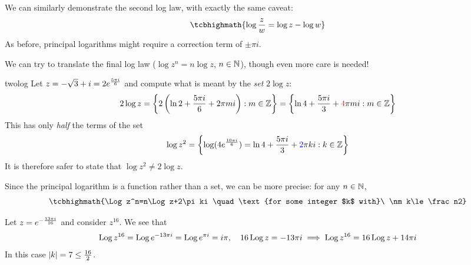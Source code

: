 We can similarly demonstrate the second log law, with exactly the same caveat:
\[
	\tcbhighmath{\log\frac zw=\log z-\log w}
\]
As before, principal logarithms might require a correction term of $\pm\pi i$.\bigbreak

\vfil
\goodbreak%
We can  try to translate the final log law ($\log z^n=n\log z$, $n\in\mathbb{N}$), though even more care is needed!

\begin{example}{}{twolog}
	Let $z=-\sqrt 3+i=2e^{\frac{5\pi i}{6}}$ and compute what is meant by the \emph{set} $2\log z$:
	\[
		2\log z=\left\{2\left(\ln 2+\frac{5\pi i}6 +2\pi mi\right):m\in\mathbb{Z}\right\}
		=\left\{\ln 4+\frac{5\pi i}3+\textcolor{red}{4}\pi mi:m\in\mathbb{Z}\right\}
	\]
	This has only \emph{half} the terms of the set
	\[
		\log z^2=\left\{\log(4e^{\frac{10\pi i}{6}})=\ln 4+\frac{5\pi i}3+\textcolor{blue}{2}\pi ki :k\in\mathbb{Z}\right\}
	\]
	It is therefore safer to state that $\log z^2\neq 2\log z$.
\end{example}

Since the principal logarithm is a function rather than a set, we can be more precise: for any $n\in\mathbb{N}$,
\[
	\tcbhighmath{\Log z^n=n\Log z+2\pi ki
	\quad\text{for some integer $k$ with}\ \nm k\le \frac n2}
\]

\begin{example}{}{}
	Let $z=e^{-\frac{13\pi i}{16}}$ and consider $z^{16}$. We see that
	\[
		\operatorname{Log} z^{16}=\operatorname{Log} e^{-13\pi i}=\operatorname{Log} e^{\pi i} =i\pi,
		\quad 16\operatorname{Log} z=-13\pi i
		\implies \operatorname{Log} z^{16}=16\operatorname{Log} z+14\pi i
	\]
	In this case $\left| k\right|=7\le \frac{16}2$.
\end{example}


